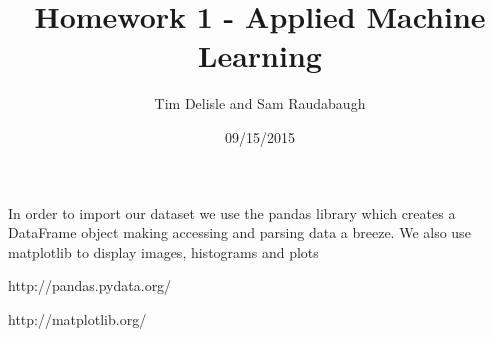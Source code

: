 \documentclass[12pt]{report}
\begin{document}
\lstset{language=Python}

\title{Homework 1 - Applied Machine Learning}
\author{Tim Delisle and Sam Raudabaugh}
\date{09/15/2015}
\maketitle


In order to import our dataset we use the pandas library which creates a DataFrame object making accessing and parsing data a breeze. We also use matplotlib to display images, histograms and plots

http://pandas.pydata.org/

http://matplotlib.org/

\end{document}
